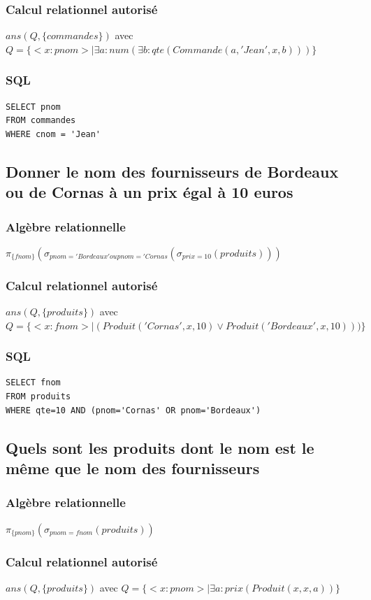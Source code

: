 \documentclass[10pt,a4paper,twoside]{article}
\begin{document}
\subsubsection{Calcul relationnel autorisé}
$ans(Q,\{commandes\})$ avec $Q=\{<x:pnom> \mid \exists a:num(\exists b:qte(Commande(a,'Jean',x,b)))\}$
\subsubsection{SQL}
\begin{verbatim}
SELECT pnom 
FROM commandes
WHERE cnom = 'Jean'
\end{verbatim}

\subsection{Donner le nom des fournisseurs de Bordeaux ou de Cornas à un prix égal à 10 euros}
\subsubsection{Algèbre relationnelle}
$\pi_{\{fnom\}}(\sigma_{pnom='Bordeaux' ou pnom='Cornas}(\sigma_{prix=10}(produits)))$
\subsubsection{Calcul relationnel autorisé}
$ans(Q,\{produits\})$ avec $Q=\{<x:fnom> \mid  (Produit('Cornas',x,10) \vee Produit('Bordeaux',x,10)))\}$
\subsubsection{SQL}
\begin{verbatim}
SELECT fnom 
FROM produits
WHERE qte=10 AND (pnom='Cornas' OR pnom='Bordeaux')
\end{verbatim}

\subsection{Quels sont les produits dont le nom est le même que le nom des fournisseurs}
\subsubsection{Algèbre relationnelle}
$\pi_{\{pnom\}}(\sigma_{pnom=fnom}(produits))$
\subsubsection{Calcul relationnel autorisé}
$ans(Q,\{produits\})$ avec $Q=\{<x:pnom> \mid \exists a:prix(Produit(x,x,a))\}$
\end{document}
